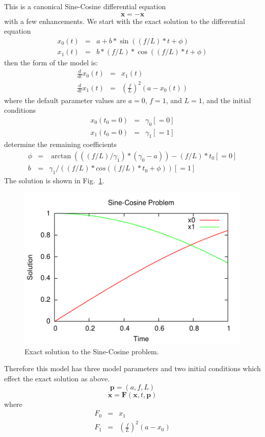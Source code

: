This is a canonical Sine-Cosine differential equation
\[
\mathbf{\ddot{x}}=-\mathbf{x}
\]
with a few enhancements. We start with the exact solution to the differential
equation 
\begin{eqnarray*}
x_{0}(t) & = & a+b*\sin((f/L)*t+\phi)\\
x_{1}(t) & = & b*(f/L)*\cos((f/L)*t+\phi)
\end{eqnarray*}
then the form of the model is: 
\begin{eqnarray*}
\frac{d}{dt}x_{0}(t) & = & x_{1}(t)\\
\frac{d}{dt}x_{1}(t) & = & \left(\frac{f}{L}\right)^{2}(a-x_{0}(t))
\end{eqnarray*}
where the default parameter values are $a=0$, $f=1$, and $L=1$,
and the initial conditions
\begin{eqnarray*}
x_{0}(t_{0}=0) & = & \gamma_{0}[=0]\\
x_{1}(t_{0}=0) & = & \gamma_{1}[=1]
\end{eqnarray*}
determine the remaining coefficients
\begin{eqnarray*}
\phi & = & \arctan(((f/L)/\gamma_{1})*(\gamma_{0}-a))-(f/L)*t_{0}[=0]\\
b & = & \gamma_{1}/((f/L)*cos((f/L)*t_{0}+\phi))[=1]
\end{eqnarray*}
The solution is shown in Fig.~\ref{rythmos:fig:SinCos-exact}. 
\begin{figure}


\begin{centering}
\includegraphics{figures/sincos}\caption{Exact solution to the Sine-Cosine problem.\label{rythmos:fig:SinCos-exact}}

\par\end{centering}

\end{figure}
Therefore this model has three model parameters and two initial conditions
which effect the exact solution as above. 
\[
\mathbf{p}=(a,f,L)
\]
\[
\dot{\mathbf{x}}=\mathbf{F}(\mathbf{x},t,\mathbf{p})
\]
where
\begin{eqnarray*}
F_{0} & = & x_{1}\\
F_{1} & = & \left(\frac{f}{L}\right)^{2}(a-x_{0})
\end{eqnarray*}


